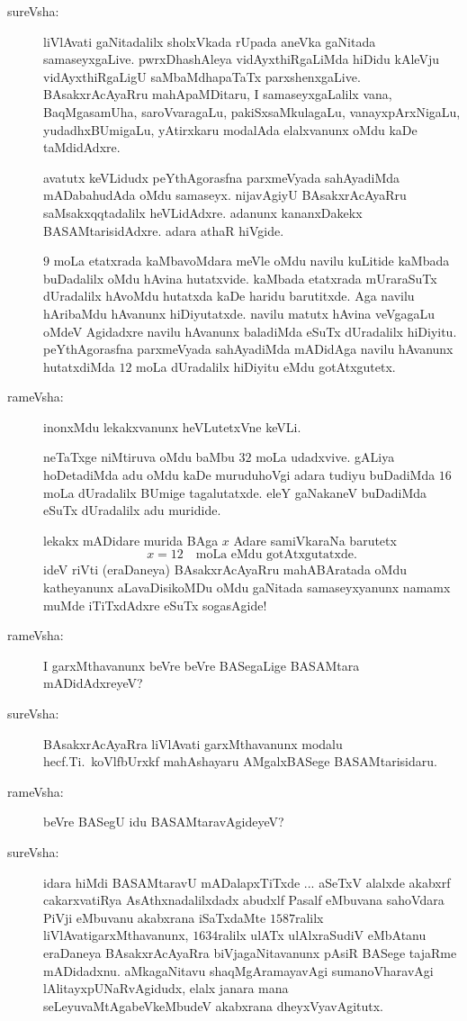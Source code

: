 \begin{description}
\item[sureVsha:] liVlAvati gaNitadalilx sholxVkada rUpada aneVka gaNitada samaseyxgaLive. pwrxDhashAleya vidAyxthiRgaLiMda hiDidu kAleVju vidAyxthiRgaLigU saMbaMdhapaTaTx parxshenxgaLive. BAsakxrAcAyaRru mahApaMDitaru, I samaseyxgaLalilx vana, BaqMgasamUha, saroVvaragaLu, pakiSxsaMkulagaLu, vanayxpArxNigaLu, yudadhxBUmigaLu, yAtirxkaru modalAda elalxvanunx oMdu kaDe taMdidAdxre.

avatutx keVLidudx peYthAgorasfna parxmeVyada sahAyadiMda mADabahudAda oMdu samaseyx. nijavAgiyU BAsakxrAcAyaRru saMsakxqqtadalilx heVLidAdxre. adanunx kananxDakekx BASAMtarisidAdxre. adara athaR hiVgide.

$9$ moLa etatxrada kaMbavoMdara meVle oMdu navilu kuLitide kaMbada buDadalilx oMdu hAvina hutatxvide. kaMbada etatxrada mUraraSuTx dUradalilx hAvoMdu hutatxda kaDe haridu barutitxde. Aga navilu hAribaMdu hAvanunx hiDiyutatxde. navilu matutx hAvina veVgagaLu oMdeV Agidadxre navilu hAvanunx baladiMda eSuTx dUradalilx hiDiyitu. peYthAgorasfna parxmeVyada sahAyadiMda mADidAga navilu hAvanunx hutatxdiMda $12$ moLa dUradalilx hiDiyitu eMdu gotAtxgutetx.

\item[rameVsha:] inonxMdu lekakxvanunx heVLutetxVne keVLi.

neTaTxge niMtiruva oMdu baMbu $32$ moLa udadxvive. gALiya hoDetadiMda adu oMdu kaDe muruduhoVgi adara tudiyu buDadiMda $16$ moLa dUradalilx BUmige tagalutatxde. eleY gaNakaneV buDadiMda eSuTx dUradalilx adu muridide.

lekakx mADidare murida BAga $x$ Adare samiVkaraNa barutetx
$$
x=12\text{~~ moLa eMdu gotAtxgutatxde.}
$$
ideV riVti (eraDaneya) BAsakxrAcAyaRru mahABAratada oMdu katheyanunx aLavaDisikoMDu oMdu gaNitada samaseyxyanunx namamx muMde iTiTxdAdxre eSuTx sogasAgide!

\item[rameVsha:] I garxMthavanunx beVre beVre BASegaLige BASAMtara mADidAdxreyeV?

\item[sureVsha:] BAsakxrAcAyaRra liVlAvati garxMthavanunx modalu hecf.Ti.\ koVlfbUrxkf mahAshayaru AMgalxBASege BASAMtarisidaru.

\item[rameVsha:] beVre BASegU idu BASAMtaravAgideyeV?

\item[sureVsha:] idara hiMdi BASAMtaravU mADalapxTiTxde ... aSeTxV alalxde akabxrf cakarxvatiRya AsAthxnadalilxdadx abudxlf Pasalf eMbuvana sahoVdara PiVji eMbuvanu akabxrana iSaTxdaMte $1587$ralilx liVlAvatigarxMthavanunx, $1634$ralilx ulATx ulAlxraSudiV eMbAtanu eraDaneya BAsakxrAcAyaRra biVjagaNitavanunx pAsiR BASege tajaRme mADidadxnu. aMkagaNitavu shaqMgAramayavAgi sumanoVharavAgi lAlitayxpUNaRvAgidudx, elalx janara mana seLeyuvaMtAgabeVkeMbudeV akabxrana dheyxVyavAgitutx.


\end{description}
